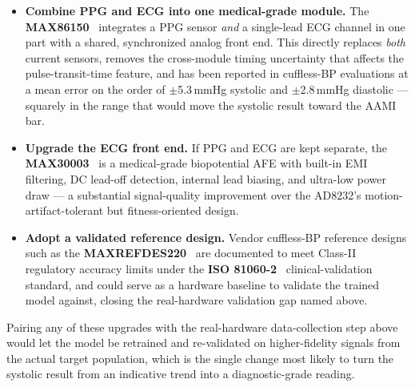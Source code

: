 \documentclass[12pt,a4paper]{report}
\begin{document}
\begin{itemize}[leftmargin=1.4em]
  \item \textbf{Combine PPG and ECG into one medical-grade module.} The
  \textbf{MAX86150}~\cite{max86150} integrates a PPG sensor \emph{and} a
  single-lead ECG channel in one part with a shared, synchronized analog front
  end. This directly replaces \emph{both} current sensors, removes the
  cross-module timing uncertainty that affects the pulse-transit-time feature,
  and has been reported in cuffless-BP evaluations at a mean error on the order
  of $\pm$5.3\,mmHg systolic and $\pm$2.8\,mmHg diastolic --- squarely in the
  range that would move the systolic result toward the AAMI bar.
  \item \textbf{Upgrade the ECG front end.} If PPG and ECG are kept separate,
  the \textbf{MAX30003}~\cite{max30003} is a medical-grade biopotential AFE with
  built-in EMI filtering, DC lead-off detection, internal lead biasing, and
  ultra-low power draw --- a substantial signal-quality improvement over the
  AD8232's motion-artifact-tolerant but fitness-oriented design.
  \item \textbf{Adopt a validated reference design.} Vendor cuffless-BP
  reference designs such as the \textbf{MAXREFDES220}~\cite{maxrefdes} are
  documented to meet Class-II regulatory accuracy limits under the
  \textbf{ISO 81060-2}~\cite{aami} clinical-validation standard, and could serve
  as a hardware baseline to validate the trained model against, closing the
  real-hardware validation gap named above.
\end{itemize}

Pairing any of these upgrades with the real-hardware data-collection step above
would let the model be retrained and re-validated on higher-fidelity signals
from the actual target population, which is the single change most likely to
turn the systolic result from an indicative trend into a diagnostic-grade
reading.
\end{document}
